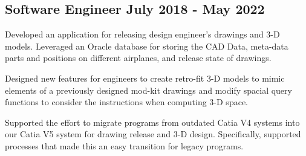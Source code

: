
\subsection{{Software Engineer \hfill July 2018 - May 2022}}
\begin{zitemize}
\item Developed an application for releasing design engineer's drawings and 3-D models. Leveraged an Oracle database for storing the CAD Data, meta-data parts and positions on different airplanes, and release state of drawings.
\item Designed new features for engineers to create retro-fit 3-D models to mimic elements of a previously designed mod-kit drawings and modify spacial query functions to consider the instructions when computing 3-D space.
\item Supported the effort to migrate programs from outdated Catia V4 systems into our Catia V5 system for drawing release and 3-D design. Specifically, supported processes that made this an easy transition for legacy programs.
\end{zitemize}


